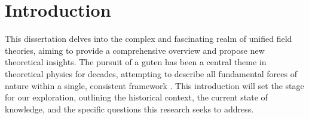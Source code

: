 \chapter*{Introduction} %
\label{chap:introduction}
This dissertation delves into the complex and fascinating realm of unified field theories, aiming to provide a comprehensive overview and propose new theoretical insights. The pursuit of a \gls{guten} has been a central theme in theoretical physics for decades, attempting to describe all fundamental forces of nature within a single, consistent framework \cite{Smith2023}. This introduction will set the stage for our exploration, outlining the historical context, the current state of knowledge, and the specific questions this research seeks to address.
\blindtext[2] %
